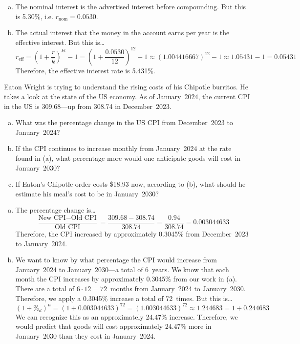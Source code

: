 \documentclass[12pt,letterpaper]{exam}
\begin{document}
\begin{questions}
\begin{enumerate}[(a)]
\item The nominal interest is the advertised interest before compounding. But this is 5.30\%, i.e. $r_{\text{nom}}= 0.0530$. \pspace

\item The actual interest that the money in the account earns per year is the effective interest. But this is\dots
	\[
	r_{\text{eff}}= \left(1 + \dfrac{r}{k} \right)^{kt} - 1= \left(1 + \dfrac{0.0530}{12} \right)^{12} - 1 \approx (1.004416667)^{12} - 1 \approx 1.05431 - 1= 0.05431
	\]
Therefore, the effective interest rate is 5.431\%. 
\end{enumerate}



\newpage
\question[13] Eaton Wright is trying to understand the rising costs of his Chipotle burritos. He takes a look at the state of the US economy. As of January~2024, the current CPI in the US is 309.68---up from 308.74 in December~2023. 
	\begin{enumerate}[(a)]
	\item What was the percentage change in the US CPI from December~2023 to January~2024?
	\item If the CPI continues to increase monthly from January~2024 at the rate found in (a), what percentage more would one anticipate goods will cost in January~2030? 
	\item If Eaton's Chipotle order costs \$18.93 now, according to (b), what should he estimate his meal's cost to be in January~2030?
	\end{enumerate} \pspace

\sol 
\begin{enumerate}[(a)]
\item The percentage change is\dots
	\[
	\dfrac{\text{New CPI} - \text{Old CPI}}{\text{Old CPI}}= \dfrac{309.68 - 308.74}{308.74}= \dfrac{0.94}{308.74}= 0.003044633
	\]
Therefore, the CPI increased by approximately 0.3045\% from December~2023 to January~2024. \pspace

\item We want to know by what percentage the CPI would increase from January~2024 to January~2030---a total of 6~years. We know that each month the CPI increases by approximately 0.3045\% from our work in (a). There are a total of $6 \cdot 12= 72$~months from January~2024 to January~2030. Therefore, we apply a 0.3045\% increase a total of 72~times. But this is\dots
	\[
	(1 + \%_d)^n= (1 + 0.003044633)^{72}= (1.003044633)^{72} \approx 1.244683= 1 + 0.244683
	\]
We can recognize this as an approximately 24.47\% increase. Therefore, we would predict that goods will cost approximately 24.47\% more in January~2030 than they cost in January~2024. \pspace


\end{enumerate}
\end{questions}
\end{document}
